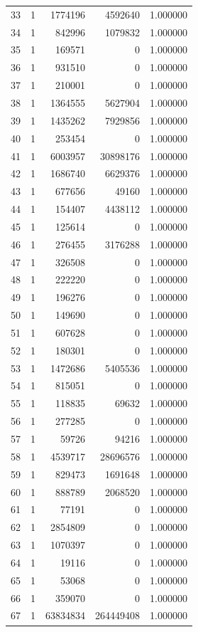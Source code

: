 \begin{longtable}{rrrrr}
33 & 1 & 1774196 & 4592640 & 1.000000\\
34 & 1 & 842996 & 1079832 & 1.000000\\
35 & 1 & 169571 & 0 & 1.000000\\
36 & 1 & 931510 & 0 & 1.000000\\
37 & 1 & 210001 & 0 & 1.000000\\
38 & 1 & 1364555 & 5627904 & 1.000000\\
39 & 1 & 1435262 & 7929856 & 1.000000\\
40 & 1 & 253454 & 0 & 1.000000\\
41 & 1 & 6003957 & 30898176 & 1.000000\\
42 & 1 & 1686740 & 6629376 & 1.000000\\
43 & 1 & 677656 & 49160 & 1.000000\\
44 & 1 & 154407 & 4438112 & 1.000000\\
45 & 1 & 125614 & 0 & 1.000000\\
46 & 1 & 276455 & 3176288 & 1.000000\\
47 & 1 & 326508 & 0 & 1.000000\\
48 & 1 & 222220 & 0 & 1.000000\\
49 & 1 & 196276 & 0 & 1.000000\\
50 & 1 & 149690 & 0 & 1.000000\\
51 & 1 & 607628 & 0 & 1.000000\\
52 & 1 & 180301 & 0 & 1.000000\\
53 & 1 & 1472686 & 5405536 & 1.000000\\
54 & 1 & 815051 & 0 & 1.000000\\
55 & 1 & 118835 & 69632 & 1.000000\\
56 & 1 & 277285 & 0 & 1.000000\\
57 & 1 & 59726 & 94216 & 1.000000\\
58 & 1 & 4539717 & 28696576 & 1.000000\\
59 & 1 & 829473 & 1691648 & 1.000000\\
60 & 1 & 888789 & 2068520 & 1.000000\\
61 & 1 & 77191 & 0 & 1.000000\\
62 & 1 & 2854809 & 0 & 1.000000\\
63 & 1 & 1070397 & 0 & 1.000000\\
64 & 1 & 19116 & 0 & 1.000000\\
65 & 1 & 53068 & 0 & 1.000000\\
66 & 1 & 359070 & 0 & 1.000000\\
67 & 1 & 63834834 & 264449408 & 1.000000\\

\end{longtable}
